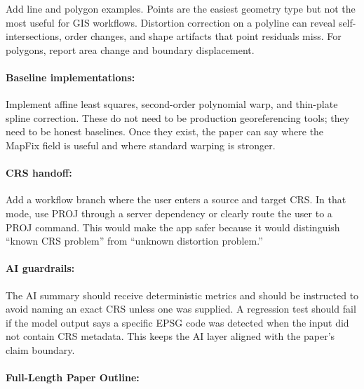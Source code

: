\documentclass{article}
\begin{document}
Add line and polygon examples. Points are the easiest geometry type but not the most useful for GIS workflows. Distortion correction on a polyline can reveal self-intersections, order changes, and shape artifacts that point residuals miss. For polygons, report area change and boundary displacement.

\paragraph{Baseline implementations:}

Implement affine least squares, second-order polynomial warp, and thin-plate spline correction. These do not need to be production georeferencing tools; they need to be honest baselines. Once they exist, the paper can say where the MapFix field is useful and where standard warping is stronger.

\paragraph{CRS handoff:}

Add a workflow branch where the user enters a source and target CRS. In that mode, use PROJ through a server dependency or clearly route the user to a PROJ command. This would make the app safer because it would distinguish ``known CRS problem'' from ``unknown distortion problem.''

\paragraph{AI guardrails:}

The AI summary should receive deterministic metrics and should be instructed to avoid naming an exact CRS unless one was supplied. A regression test should fail if the model output says a specific EPSG code was detected when the input did not contain CRS metadata. This keeps the AI layer aligned with the paper's claim boundary.

\paragraph{Full-Length Paper Outline:}
\end{document}
